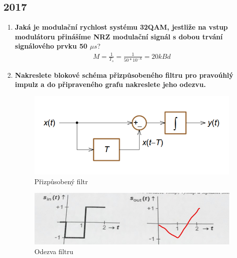 \subsection{2017}
\begin{enumerate}
    \item \textbf{Jaká je modulační rychlost systému 32QAM, jestliže na vstup modulátoru přinášíme NRZ modulační signál s dobou trvání signálového prvku 50 $\mu s$}?
    \begin{gather*}
        M=\frac{1}{T_s}=\frac{1}{50*10^{-6}}=20 kBd  
    \end{gather*}

    \item \textbf{Nakreslete blokové schéma přizpůsobeného filtru pro pravoúhlý impulz a do připraveného grafu nakreslete jeho odezvu.}
    \begin{figure}[h!]
        \centering
        \includegraphics[scale=0.5]{images/prizfiltr.png}
        \caption{Přizpůsobený filtr}
        \label{fig:enter-label}
    \end{figure}
        \begin{figure}[h!]
        \centering
        \includegraphics[scale=0.5]{images/odezva.png}
        \caption{Odezva filtru}
        \label{fig:enter-label}
    \end{figure}


\end{enumerate}
